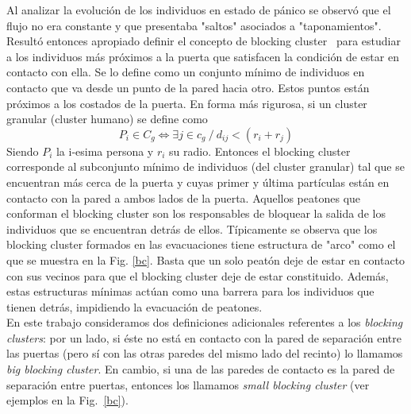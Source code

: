 Al analizar la evolución de los individuos en estado de pánico se observó que el flujo no era constante y que presentaba "saltos" asociados a "taponamientos". Resultó entonces apropiado definir 
el concepto de blocking cluster~\cite{Dorso1} para estudiar a los individuos más próximos a la puerta que satisfacen la condición de estar en contacto con ella.
Se lo define como un conjunto mínimo de individuos en contacto que va desde un punto de la pared hacia otro. Estos puntos están próximos a los costados de la puerta. En forma más rigurosa, si un cluster granular (cluster humano) se define como 
\begin{equation}
P_i \in C_g \Longleftrightarrow \exists j \in c_g ~/~ d_{ij}<(r_i+r_j)
\end{equation} 
Siendo $P_i$  la i-esima persona y $r_i$ su radio. Entonces el blocking cluster corresponde al subconjunto mínimo de individuos (del cluster granular) tal que se encuentran más cerca de la puerta y cuyas primer y última partículas están en contacto con la pared a ambos lados de la puerta.   
Aquellos peatones que conforman el blocking cluster son los responsables de bloquear la salida de los individuos que se encuentran detrás de ellos. Típicamente se observa que los blocking cluster formados en las evacuaciones tiene estructura de "arco" como el que se muestra en la Fig. \ref{bc}. Basta que un solo peatón deje de estar en contacto con sus vecinos para que el blocking cluster deje de estar constituido. Además, estas estructuras mínimas actúan como una barrera para los individuos que tienen detrás, impidiendo la evacuación de peatones. \\

En este trabajo consideramos dos definiciones adicionales referentes a los \textit{blocking clusters}: por un lado, si éste no está en contacto con la pared de separación entre las puertas (pero sí con las otras paredes del mismo lado del recinto) lo llamamos \textit{big blocking cluster}. En cambio, si una de las paredes de contacto es la pared de separación entre puertas, entonces los llamamos \textit{small blocking cluster} (ver ejemplos en la Fig.~\ref{bc}).

